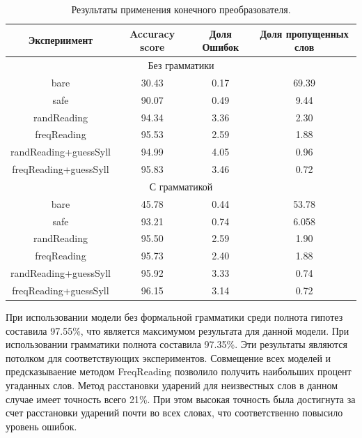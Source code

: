 \documentclass[14pt, a4paper, russian]{report}
\begin{document}
\begin{normalsize}
\begin{table}[H]
	\begin{small}
		\begin{center}
			\begin{tabular}{|c|c|c|c|}
				\hline
				Экспериимент & Accuracy score & Доля Ошибок & Доля пропущенных слов\\
				\hline
				\multicolumn{4}{|c|}{Без грамматики} \\			
				\hline
				bare & 30.43 & 0.17 & 69.39 \\
				\hline
				safe & 90.07 & 0.49 & 9.44 \\
				\hline
				randReading &94.34 &3.36 &2.30 \\
				\hline
				freqReading &95.53 &2.59& 1.88 \\
				\hline
				randReading+guessSyll &94.99 &4.05 &0.96 \\
				\hline
				freqReading+guessSyll & 95.83 &3.46 &0.72\\
				\hline
				\multicolumn{4}{|c|}{С грамматикой} \\			
				\hline
				bare &45.78 & 0.44 &53.78\\
				\hline
				safe &93.21& 0.74 &6.058 \\
				\hline
				randReading &95.50 &2.59 &1.90 \\
				\hline
				freqReading &95.73 &2.40 &1.88 \\
				\hline
				randReading+guessSyll &95.92 &3.33 &0.74 \\
				\hline
				freqReading+guessSyll &96.15 &3.14 &0.72 \\
				\hline
				
			\end{tabular}
		\end{center}
	\end{small}
	\caption{Результаты применения конечного преобразователя.}
	\label{table:final_state_result}
	
\end{table}

При использовании модели без формальной грамматики среди полнота гипотез составила 97.55\%, что является максимумом результата для данной модели. При использовании грамматики полнота составила 97.35\%. Эти результаты являются потолком для соответствующих экспериментов. Совмещение всех моделей и предсказываение методом FreqReading  позволило получить наибольших процент угаданных слов. Метод расстановки ударений для неизвестных слов в данном случае имеет точность всего 21\%. При этом высокая точность была достигнута за счет расстановки ударений почти во всех словах, что соответственно повысило уровень ошибок. 


\end{normalsize}
\end{document}
